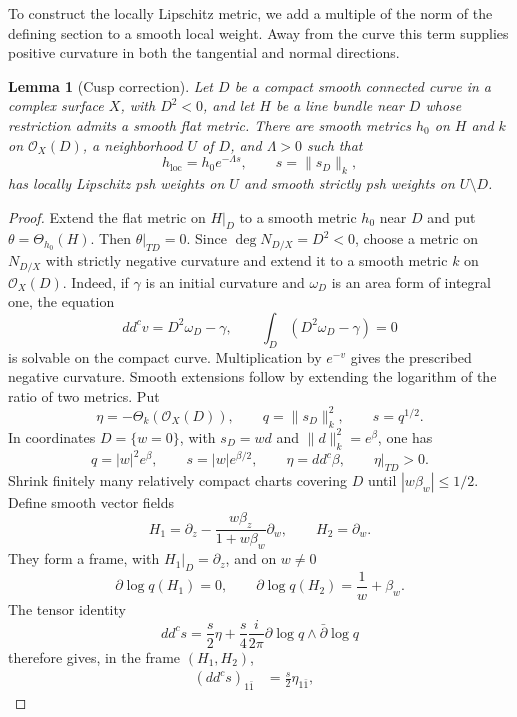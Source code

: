 \documentclass[11pt]{amsart}
\newtheorem{lemma}[theorem]{Lemma}
\theoremstyle{definition}
\theoremstyle{remark}
\numberwithin{equation}{section}
\newcommand{\OO}{\mathcal O}
\newcommand{\ddc}{dd^c}
\newcommand{\barp}{\bar\partial}
\begin{document}
To construct the locally Lipschitz metric, we add a multiple of the
norm of the defining section to a smooth local weight. Away from the
curve this term supplies positive curvature in both the tangential and
normal directions.

\begin{lemma}[Cusp correction]\label{lem:cusp}
Let $D$ be a compact smooth connected curve in a complex surface $X$, with
$D^2<0$, and let $H$ be a line bundle near $D$ whose restriction
admits a smooth flat metric. There are smooth metrics $h_0$ on
$H$ and $k$ on $\OO_X(D)$, a neighborhood $U$ of $D$, and
$\Lambda>0$ such that
\[
 h_{\mathrm{loc}}=h_0e^{-\Lambda s},\qquad
 s=\|s_D\|_k,
\]
has locally Lipschitz psh weights on $U$ and smooth strictly psh
weights on $U\setminus D$.
\end{lemma}
\begin{proof}
Extend the flat metric on $H|_D$ to a smooth metric $h_0$ near $D$
and put $\theta=\Theta_{h_0}(H)$. Then $\theta|_{TD}=0$.
Since $\deg N_{D/X}=D^2<0$, choose a metric on $N_{D/X}$
with strictly negative curvature and extend it to a smooth metric
$k$ on $\OO_X(D)$. Indeed, if $\gamma$ is an initial curvature
and $\omega_D$ is an area form of integral one, the equation
\[
 \ddc v=D^2\omega_D-\gamma,\qquad
 \int_D(D^2\omega_D-\gamma)=0
\]
is solvable on the compact curve. Multiplication by $e^{-v}$
gives the prescribed negative curvature. Smooth extensions follow
by extending the logarithm of the ratio of two metrics. Put
\[
 \eta=-\Theta_k(\OO_X(D)),\qquad
 q=\|s_D\|_k^2,\qquad s=q^{1/2}.
\]
In coordinates $D=\{w=0\}$, with $s_D=wd$ and
$\|d\|_k^2=e^\beta$, one has
\begin{equation}\label{eq:baseline-metric}
 q=|w|^2e^\beta,\qquad s=|w|e^{\beta/2},\qquad
 \eta=\ddc\beta,\qquad \eta|_{TD}>0.
\end{equation}
Shrink finitely many relatively compact charts covering $D$ until
$|w\beta_w|\le1/2$. Define smooth vector fields
\[
 H_1=\partial_z-\frac{w\beta_z}{1+w\beta_w}\partial_w,
 \qquad H_2=\partial_w.
\]
They form a frame, with $H_1|_D=\partial_z$, and on $w\ne0$
\[
 \partial\log q(H_1)=0,\qquad
 \partial\log q(H_2)=\frac1w+\beta_w.
\]
The tensor identity
\begin{equation}\label{eq:scaled-cusp}
 \ddc s=\frac{s}{2}\eta+
 \frac{s}{4}\frac{i}{2\pi}
       \partial\log q\wedge\barp\log q
\end{equation}
therefore gives, in the frame $(H_1,H_2)$,
\[
 \begin{aligned}
 (\ddc s)_{1\bar1}&=\tfrac{s}{2}\eta_{1\bar1},&

\end{aligned}\]
\end{proof}
\end{document}
